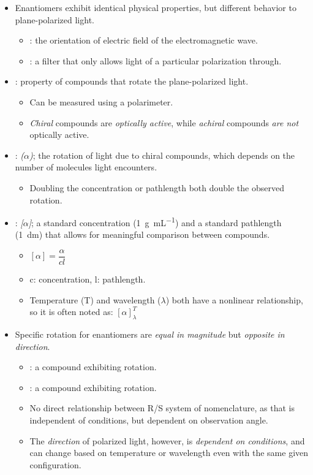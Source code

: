 \documentclass{inVerba-notes}
\begin{document}
\begin{itemize}
    \item Enantiomers exhibit identical physical properties, but different behavior to plane-polarized light.
        \begin{itemize}
            \item {}: the orientation of electric field of the electromagnetic wave.
            \item {}: a filter that only allows light of a particular polarization through.
        \end{itemize}
    \item {}: property of compounds that rotate the plane-polarized light.
        \begin{itemize}
            \item Can be measured using a polarimeter.
            \item \emph{Chiral} compounds are \emph{optically active}, while \emph{achiral} compounds \emph{are not} optically active.
        \end{itemize}
    \item {}:  \emph{(\(\alpha \))}; the rotation of light due to chiral compounds, which depends on the number of molecules light encounters.
        \begin{itemize}
            \item Doubling the concentration or pathlength both double the observed rotation.
        \end{itemize}
    \item {}: \emph{[\(\alpha \)]}; a standard concentration (\SI{1}{g\per\mL}) and a standard pathlength (\SI{1}{dm}) that allows for meaningful comparison between compounds.
        \begin{itemize}
            \item \([\alpha]=\dfrac{\alpha}{cl} \)
            \item c: concentration, l: pathlength.
            \item Temperature (T) and wavelength (\(\lambda \)) both have a nonlinear relationship, so it is often noted as: \( [\alpha]^T_\lambda \)
        \end{itemize}
    \item Specific rotation for enantiomers are \emph{equal in magnitude} but \emph{opposite in direction}.
        \begin{itemize}
            \item {}: a compound exhibiting  rotation.
            \item {}: a compound exhibiting  rotation.
            \item No direct relationship between R/S system of nomenclature, as that is independent of conditions, but dependent on observation angle.
            \item The \emph{direction} of polarized light, however, is \emph{dependent on conditions}, and can change based on temperature or wavelength even with the same given configuration.
        \end{itemize}

\end{itemize}
\end{document}
